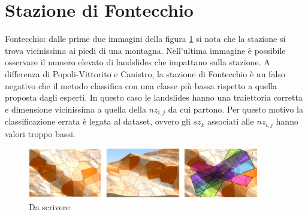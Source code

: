 \section{Stazione di Fontecchio}
Fontecchio: dalle prime due immagini della figura \ref{Fontechio_Final} si nota che la stazione si trova vicinissima  ai piedi di una montagna. Nell'ultima immagine è possibile osservare il numero elevato di landslides che impattano sulla stazione. A differenza di Popoli-Vittorito e Canistro, la stazione di Fontecchio è un falso negativo che il metodo classifica con una classe più bassa rispetto a quella proposta dagli esperti. In questo caso le landslides hanno una traiettoria corretta e dimensione vicinissima a quella della $nz_{i,j}$ da cui partono. Per questo motivo la classificazione errata è legata al dataset, ovvero gli $sz_k$ associati alle $nz_{i,j}$ hanno valori troppo bassi.
	\begin{figure}[h]
		\centering
		\includegraphics[width=0.9\textwidth]{images/FontecchioFinal}
		\caption{Da scrivere}
		\label{Fontechio_Final}
	\end{figure}